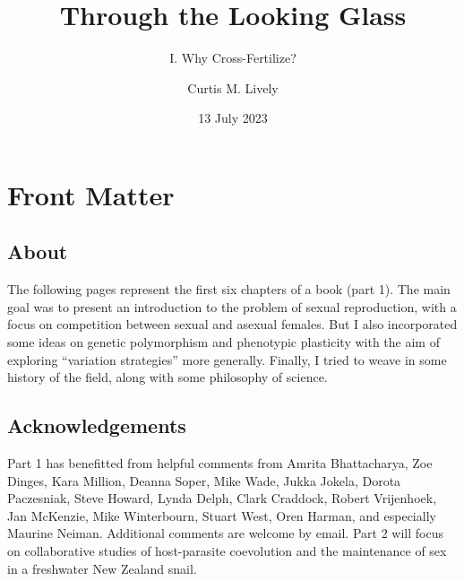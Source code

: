 \documentclass[
  letterpaper,
]{book}
\title{Through the Looking Glass}
\subtitle{I. Why Cross-Fertilize?}
\author{Curtis M. Lively}
\date{13 July 2023}
\renewcommand*\contentsname{Table of contents}
\newcommand\contentsname{Table of contents}
\begin{document}
\frontmatter
\maketitle
\ifdefined\Shaded\renewenvironment{Shaded}{\begin{tcolorbox}[enhanced, interior hidden, borderline west={3pt}{0pt}{shadecolor}, sharp corners, breakable, frame hidden, boxrule=0pt]}{\end{tcolorbox}}\fi

\renewcommand*\contentsname{Contents}
{
\hypersetup{linkcolor=}
\setcounter{tocdepth}{2}
\tableofcontents
}
\listoffigures
\listoftables
\mainmatter
{}

\hypertarget{front-matter}{%
\chapter*{Front Matter}\label{front-matter}}


\hypertarget{about}{%
\section*{About}\label{about}}


The following pages represent the first six chapters of a book (part 1).
The main goal was to present an introduction to the problem of sexual
reproduction, with a focus on competition between sexual and asexual
females. But I also incorporated some ideas on genetic polymorphism and
phenotypic plasticity with the aim of exploring ``variation strategies''
more generally. Finally, I tried to weave in some history of the field,
along with some philosophy of science.

\hypertarget{acknowledgements}{%
\section*{Acknowledgements}\label{acknowledgements}}


Part 1 has benefitted from helpful comments from Amrita Bhattacharya,
Zoe Dinges, Kara Million, Deanna Soper, Mike Wade, Jukka Jokela, Dorota
Paczesniak, Steve Howard, Lynda Delph, Clark Craddock, Robert
Vrijenhoek, Jan McKenzie, Mike Winterbourn, Stuart West, Oren Harman,
and especially Maurine Neiman. Additional comments are welcome by email.
Part 2 will focus on collaborative studies of host-parasite coevolution
and the maintenance of sex in a freshwater New Zealand snail.
\end{document}
